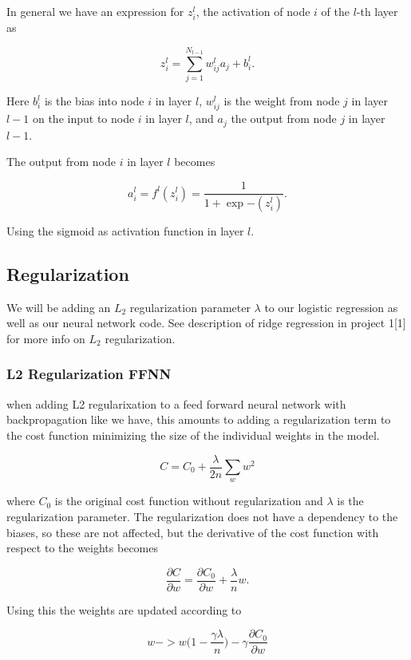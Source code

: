\documentclass[11pt]{article}
\begin{document}
    In general we have an expression for \(z_i^l\), the activation of node
\(i\) of the \(l\)-th layer as

\[
z_i^l = \sum_{j=1}^{N_{l-1}}w_{ij}^la_j+b_i^l.
\]

Here \(b_i^l\) is the bias into node \(i\) in layer \(l\), \(w_{ij}^l\)
is the weight from node \(j\) in layer \(l-1\) on the input to node
\(i\) in layer \(l\), and \(a_j\) the output from node \(j\) in layer
\(l-1\).

The output from node \(i\) in layer \(l\) becomes

\[
a_i^l = f^l(z_i^l) = \frac{1}{1+\exp{-(z_i^l)}}.
\]

Using the sigmoid as activation function in layer \(l\).

    \hypertarget{regularization}{%
\subsection{Regularization}\label{regularization}}

We will be adding an \(L_2\) regularization parameter \(\lambda\) to our
logistic regression as well as our neural network code. See description
of ridge regression in project 1{[}1{]} for more info on \(L_2\)
regularization.

\hypertarget{l2-regularization-ffnn}{%
\subsubsection{L2 Regularization FFNN}\label{l2-regularization-ffnn}}

when adding L2 regularixation to a feed forward neural network with
backpropagation like we have, this amounts to adding a regularization
term to the cost function minimizing the size of the individual weights
in the model.

\[
C = C_0 + \frac{\lambda}{2n}\sum_w w^2
\]

where \(C_0\) is the original cost function without regularization and
\(\lambda\) is the regularization parameter. The regularization does not
have a dependency to the biases, so these are not affected, but the
derivative of the cost function with respect to the weights becomes

\[
\frac{\partial C}{\partial w} = \frac{\partial C_0}{\partial w} + \frac{\lambda}{n}w.
\]

Using this the weights are updated according to

\[
w -> w\bigg(1-\frac{\gamma\lambda}{n}\bigg)-\gamma\frac{\partial C_0}{\partial w}
\]
\end{document}
